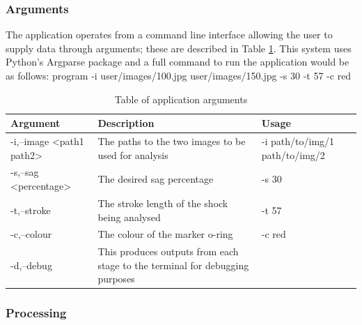 		\subsubsection{Arguments}
			The application operates from a command line interface allowing the user to supply data through arguments; these are described in Table \ref{tab:arguments}. This system uses Python's Argparse package and a full command to run the application would be as follows:
			{\centering \ttfamily program -i user/images/100.jpg user/images/150.jpg -s 30 -t 57 -c red}
			\begin{table}[h!]
				\centering
				\caption{Table of application arguments}
				\label{tab:arguments}
				\begin{tabular}{|l|p{}|p{}|}
					\hline
					\bfseries Argument&\bfseries Description&\bfseries Usage\\
					\hline
					{\ttfamily -i,--image <path1 path2>}&The paths to the two images to be used for analysis&{\ttfamily -i path/to/img/1 path/to/img/2}\\
					\hline
					{\ttfamily -s,--sag <percentage>}&The desired sag percentage&{\ttfamily -s 30}\\
					\hline
					{\ttfamily -t,--stroke}&The stroke length of the shock being analysed&{\ttfamily -t 57}\\
					\hline
					{\ttfamily -c,--colour}&The colour of the marker o-ring&{\ttfamily -c red}\\
					\hline
					{\ttfamily -d,--debug}&This produces outputs from each stage to the terminal for debugging purposes&\\
					\hline
				\end{tabular}
			\end{table}
		\subsubsection{Processing}
